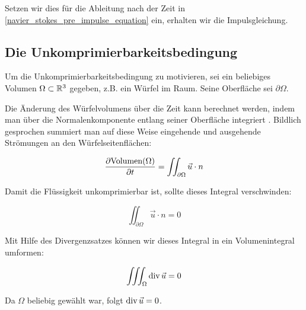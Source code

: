 Setzen wir dies für die Ableitung nach der Zeit in \autoref{navier_stokes_pre_impulse_equation} ein, erhalten wir
die Impulsgleichung.

\subsection{Die Unkomprimierbarkeitsbedingung}

Um die Unkomprimierbarkeitsbedingung zu motivieren, sei ein beliebiges Volumen
$\Omega \subset \mathbb{R}^3$ gegeben, z.B. ein Würfel im Raum. Seine
Oberfläche sei $\partial \Omega$.

Die Änderung des Würfelvolumens über die Zeit kann berechnet werden, indem man
über die Normalenkomponente entlang seiner Oberfläche integriert \cite{Chorin1980}. Bildlich
gesprochen summiert man auf diese Weise eingehende und ausgehende Strömungen an
den Würfelseitenflächen:

\begin{equation}
\frac{
	\partial \textrm{Volumen}(\Omega)
}
{
	\partial t
}
=
\iint_{\partial \Omega} \vec{u} \cdot n
\end{equation}

Damit die Flüssigkeit unkomprimierbar ist, sollte dieses Integral verschwinden:

\begin{equation}
\iint_{\partial \Omega} \vec{u} \cdot n = 0
\end{equation}

Mit Hilfe des Divergenzsatzes können wir dieses Integral in ein Volumenintegral
umformen:

\begin{equation}
\iiint_\Omega \operatorname*{div} \vec{u} = 0
\end{equation}

Da $\Omega$ beliebig gewählt war, folgt $\operatorname*{div} \vec{u} = 0$.
